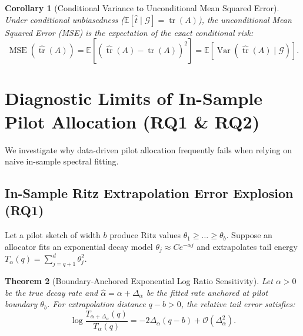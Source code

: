 \documentclass[11pt,letterpaper]{article}
\newtheorem{theorem}{Theorem}
\newtheorem{corollary}[theorem]{Corollary}
\begin{document}
\begin{corollary}[Conditional Variance to Unconditional Mean Squared Error]
Under conditional unbiasedness ($\mathbb{E}[\widehat{t} \mid \mathcal{G}] = \operatorname{tr}(A)$), the unconditional Mean Squared Error (MSE) is the expectation of the exact conditional risk:
\begin{equation}
\operatorname{MSE}(\widehat{\operatorname{tr}}(A)) = \mathbb{E}\left[ (\widehat{\operatorname{tr}}(A) - \operatorname{tr}(A))^2 \right] = \mathbb{E}\left[ \operatorname{Var}(\widehat{\operatorname{tr}}(A) \mid \mathcal{G}) \right].
\end{equation}
\end{corollary}

\newpage

\section{Diagnostic Limits of In-Sample Pilot Allocation (RQ1 \& RQ2)}

We investigate why data-driven pilot allocation frequently fails when relying on naive in-sample spectral fitting.

\subsection{In-Sample Ritz Extrapolation Error Explosion (RQ1)}
Let a pilot sketch of width $b$ produce Ritz values $\theta_1 \ge \dots \ge \theta_b$. Suppose an allocator fits an exponential decay model $\theta_j \approx C e^{-\alpha j}$ and extrapolates tail energy $T_\alpha(q) = \sum_{j=q+1}^d \theta_j^2$.

\begin{theorem}[Boundary-Anchored Exponential Log Ratio Sensitivity]
\label{thm:exp_sensitivity}
Let $\alpha > 0$ be the true decay rate and $\widehat{\alpha} = \alpha + \Delta_\alpha$ be the fitted rate anchored at pilot boundary $\theta_b$. For extrapolation distance $q - b > 0$, the relative tail error satisfies:
\begin{equation}
\log \frac{T_{\alpha+\Delta_\alpha}(q)}{T_\alpha(q)} = -2 \Delta_\alpha (q - b) + \mathcal{O}(\Delta_\alpha^2).
\end{equation}
\end{theorem}
\end{document}
